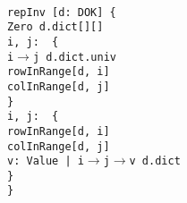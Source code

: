 \begin{myquote}\small{\texttt{\\
\Bpred repInv [d: DOK] \{\\
\TA Zero \Bnot \Bin d.dict[\Buniv][\Buniv]\\
\TA \Ball i, j: \Bint~\{\\
\TB i$\rightarrow$j \Bin d.dict.univ \Bimplies\\
\TC rowInRange[d, i] \Band\\
\TC colInRange[d, j]\\
\TA \}\\
\TA \Ball i, j: \Bint~\{\\
\TB rowInRange[d, i] \Band\\
\TB colInRange[d, j] \Bimplies\\
\TC \Blone v: Value | i$\rightarrow$j$\rightarrow$v \Bin d.dict\\
\TA \}\\
\}\\
}}
\end{myquote}